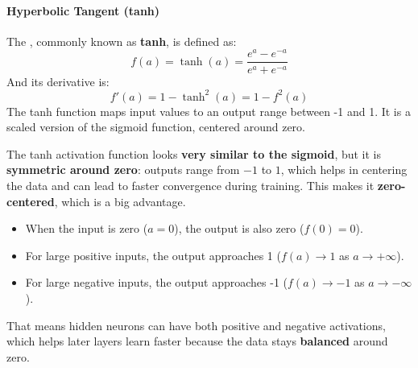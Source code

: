 \paragraph{Hyperbolic Tangent (tanh)}

The , commonly known as \textbf{tanh}, is defined as:
\begin{equation}
    f(a) = \tanh(a) = \dfrac{e^{a} - e^{-a}}{e^{a} + e^{-a}}
\end{equation}
And its derivative is:
\begin{equation}
    f'(a) = 1 - \tanh^2(a) = 1 - f^2(a)
\end{equation}
The tanh function maps input values to an output range between -1 and 1. It is a scaled version of the sigmoid function, centered around zero.

\highspace
The tanh activation function looks \textbf{very similar to the sigmoid}, but it is \textbf{symmetric around zero}: outputs range from $-1$ to $1$, which helps in centering the data and can lead to faster convergence during training. This makes it \textbf{zero-centered}, which is a big advantage.
\begin{itemize}
    \item When the input is zero ($a=0$), the output is also zero ($f(0)=0$).
    \item For large positive inputs, the output approaches 1 ($f(a) \to 1$ as $a \to +\infty$).
    \item For large negative inputs, the output approaches -1 ($f(a) \to -1$ as $a \to -\infty$).
\end{itemize}
That means hidden neurons can have both positive and negative activations, which helps later layers learn faster because the data stays \textbf{balanced} around zero.

